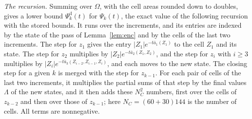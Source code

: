 \documentclass[11pt]{amsart}
\theoremstyle{definition}
\theoremstyle{remark}
\numberwithin{equation}{section}
\newcommand{\WNone}{60}\newcommand{\WNtwo}{30}\newcommand{\WNt}{144}%
\begin{document}
\emph{The recursion.} Summing over $\Omega$, with the cell areas rounded down to doubles, gives a lower bound $\Psi_k^{\mathrm d}(t)$ for $\Psi_k(t)$, the exact value of the following recursion with the stored bounds. It runs over the increments, and its entries are indexed by the state of the pass of Lemma~\ref{lem:enc} and by the cells of the last two increments. The step for $z_1$ gives the entry $|Z_1|e^{-t\bar a_1(Z_1)}$ to the cell $Z_1$ and its state. The step for $z_2$ multiplies by $|Z_2|e^{-t\bar a_2(Z_1,Z_2)}$, and the step for $z_i$ with $i\ge3$ multiplies by $|Z_i|e^{-t\bar a_3(Z_{i-2},Z_{i-1},Z_i)}$, and each moves to the new state. The closing step for a given $k$ is merged with the step for $z_{k-1}$. For each pair of cells of the last two increments, it multiplies the partial sums of that step by the final values $\Lambda$ of the new states, and it then adds these $N_C^2$ numbers, first over the cells of $z_{k-2}$ and then over those of $z_{k-1}$; here $N_C=(\WNone+\WNtwo)\WNt$ is the number of cells. All terms are nonnegative.
\end{document}
